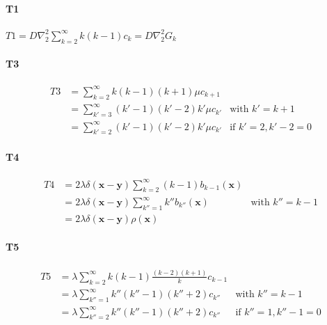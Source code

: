 \paragraph*{T1}

$T1=D\nabla^2_2\sum_{k=2}^\infty k(k-1)c_k=D\nabla_{2}^{2}G_{k}$

\paragraph*{T3}

\begin{subequations}
\begin{align}
T3 & =\sum_{k=2}^{\infty}k(k-1)(k+1)\mu c_{k+1}\label{la}\\
 & =\sum_{k'=3}^{\infty}(k'-1)(k'-2)k'\mu c_{k'} & \text{with }k'=k+1\\
 & =\sum_{k'=2}^{\infty}(k'-1)(k'-2)k'\mu c_{k'} & \text{if }k'=2,k'-2=0
\end{align}

\end{subequations}

\paragraph*{T4}

\begin{subequations}

\begin{align}
T4 & =2\lambda\delta(\boldsymbol{x}-\boldsymbol{y})\sum_{k=2}^{\infty}(k-1)b_{k-1}(\boldsymbol{x})\label{la-2}\\
 & =2\lambda\delta(\boldsymbol{x}-\boldsymbol{y})\sum_{k''=1}^{\infty}k''b_{k''}(\boldsymbol{x}) &\text{with }k''=k-1\\
 & =2\lambda\delta(\boldsymbol{x}-\boldsymbol{y})\rho(\boldsymbol{x}) &
\end{align}

\end{subequations}

\paragraph*{T5}

\begin{subequations}

\begin{align}
T5 & =\lambda\sum_{k=2}^{\infty}k(k-1)\frac{(k-2)(k+1)}{k} c_{k-1}\label{la-1}\\
 & =\lambda\sum_{k''=1}^{\infty}k''(k''-1)(k''+2) c_{k''} & \text{with }k''=k-1\\
 & =\lambda\sum_{k''=2}^{\infty}k''(k''-1)(k''+2) c_{k''} & \text{if }k''=1,k''-1=0
\end{align}

\end{subequations}

